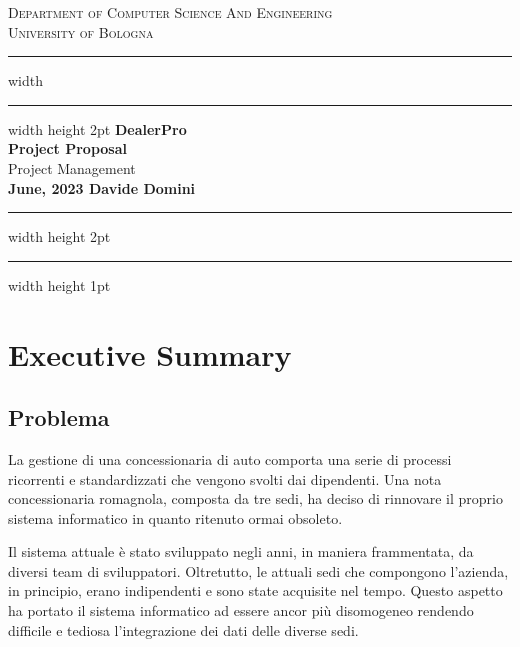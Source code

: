 \documentclass{article}
\begin{document}
\begin{titlepage}

  \newcommand{\HRule}{\rule{\linewidth}{0.5mm}}
  \center
  
  \textsc{\Large Department of Computer Science And Engineering}\\[0.5cm]
  
  \textsc{\Large University of Bologna}\\[0.6cm]
  
  \hrule width \hsize \kern 1mm \hrule width \hsize height 2pt 
  \vspace{0.8cm}
  { \large \bfseries DealerPro}\\[0.6cm]
  { \large \bfseries Project Proposal}\\[0.6cm]
  { \large Project Management}\\[0.6cm]
  
  
  {\bfseries{June, 2023}
  \hfill
  \bfseries{Davide Domini}}\\[0.6cm]
  
  \hrule width \hsize height 2pt \kern 1mm \hrule width \hsize height 1pt
  \vspace{0.4cm}
  
  \end{titlepage}

  \clearpage

  \tableofcontents

  \newpage
  
  \section{Executive Summary}

  \subsection{Problema}

  La gestione di una concessionaria di auto comporta una serie di processi ricorrenti e standardizzati che 
    vengono svolti dai dipendenti. Una nota concessionaria romagnola, composta da tre sedi, ha deciso di 
    rinnovare il proprio sistema informatico in quanto ritenuto ormai obsoleto.

  Il sistema attuale è stato sviluppato negli anni, in maniera frammentata, da diversi team di sviluppatori.
    Oltretutto, le attuali sedi che compongono l'azienda, in principio, erano indipendenti e sono state acquisite
    nel tempo. Questo aspetto ha portato il sistema informatico ad essere ancor più disomogeneo rendendo difficile 
    e tediosa l'integrazione dei dati delle diverse sedi.
\end{document}
